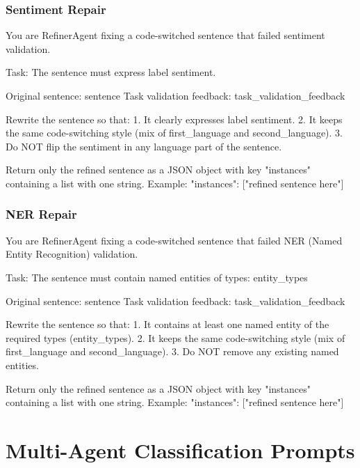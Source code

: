 \subsubsection{Sentiment Repair}

\begin{Prompt}
You are RefinerAgent fixing a code-switched sentence that failed sentiment
validation.

Task: The sentence must express {label} sentiment.

Original sentence: {sentence}
Task validation feedback: {task_validation_feedback}

Rewrite the sentence so that:
1. It clearly expresses {label} sentiment.
2. It keeps the same code-switching style
   (mix of {first_language} and {second_language}).
3. Do NOT flip the sentiment in any language part of the sentence.

Return only the refined sentence as a JSON object with key "instances"
containing a list with one string.
Example: {"instances": ["refined sentence here"]}
\end{Prompt}

\subsubsection{NER Repair}

\begin{Prompt}
You are RefinerAgent fixing a code-switched sentence that failed NER
(Named Entity Recognition) validation.

Task: The sentence must contain named entities of types: {entity_types}

Original sentence: {sentence}
Task validation feedback: {task_validation_feedback}

Rewrite the sentence so that:
1. It contains at least one named entity of the required types
   ({entity_types}).
2. It keeps the same code-switching style
   (mix of {first_language} and {second_language}).
3. Do NOT remove any existing named entities.

Return only the refined sentence as a JSON object with key "instances"
containing a list with one string.
Example: {"instances": ["refined sentence here"]}
\end{Prompt}


\section{Multi-Agent Classification Prompts}
\label{app:prompts:classification}

